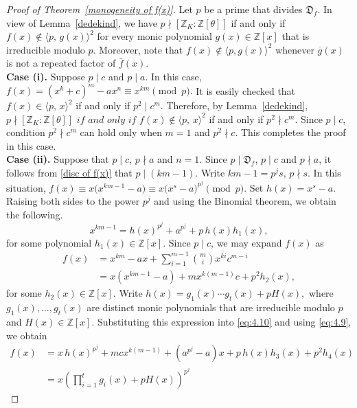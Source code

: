 \documentclass[table]{amsart}
\newcommand{\D}{\mathfrak{D}}
\numberwithin{equation}{section}
\begin{document}
\begin{proof}[Proof of Theorem~\ref{monogeneity of f(x)}]
Let $p$ be a prime that divides $\D_f$. In view of Lemma~\ref{dedekind}, we have $p \nmid [\mathbb{Z}_K : \mathbb{Z}[\theta]]$
if and only if $f(x) \not\in \langle p,\, g(x) \rangle^2$
for every monic polynomial $g(x) \in \mathbb{Z}[x]$ that is irreducible modulo $p$. Moreover, note that
$f(x) \not\in \langle p, g(x) \rangle^2$
whenever $\overline{g}(x)$ is not a repeated factor of $\bar{f}(x)$.\\[2mm]
\textbf{Case (i).} Suppose $p \mid c$ and $p \mid a$. In this case, $f(x) = (x^k + c)^m - a x^n \equiv x^{km} \pmod{p}.$ It is easily checked that $f(x) \in \langle p,\, x \rangle^2 $ if and only if $p^2 \mid c^m.$
Therefore, by Lemma~\ref{dedekind}, $p \nmid [\mathbb{Z}_K : \mathbb{Z}[\theta]]
\textit{ if and only if }
f(x) \notin \langle p,\, x \rangle^2 $ if and only if $p^2 \nmid c^m.$ Since $p \mid c$, condition $p^2 \nmid c^m$ can hold only when $m=1$ and $p^2 \nmid c$. This completes the proof in this case.\\[2mm]
\textbf{Case (ii).} Suppose that $p\mid c$, $p\nmid a$ and $n=1$.
Since $p\mid \D_f$, $p\mid c$ and $p\nmid a$, it follows from
\eqref{disc of f(x)} that $p\mid (km-1).$ Write $km-1=p^{j}s,
\, p\nmid s.$ In this situation, $f(x)\equiv x\bigl(x^{km-1}-a\bigr)
      \equiv x\bigl(x^{s}-a\bigr)^{p^{j}}
      \pmod{p}.$
Set $h(x)=x^{s}-a.$ Raising both sides to the power $p^{j}$ and using the Binomial theorem, we obtain the following.
\begin{equation}\label{eq:4.9}
x^{km-1}
= h(x)^{p^{j}} + a^{p^{j}} + p\,h(x)h_{1}(x),
\end{equation}
for some polynomial $h_{1}(x)\in\mathbb{Z}[x]$. Since $p\mid c$, we may expand $f(x)$ as
\begin{align}\label{eq:4.10}
f(x)
&= x^{km}-ax+\sum_{i=1}^{m-1}\binom{m}{i}x^{ki}c^{m-i} \nonumber \\
&= x(x^{km-1}-a)+m x^{k(m-1)}c + p^{2}h_{2}(x),
\end{align}
for some $h_{2}(x)\in\mathbb{Z}[x]$. Write $h(x)=g_{1}(x)\cdots g_{t}(x)+pH(x),$ where $g_{1}(x),\ldots,g_{t}(x)$ are distinct monic polynomials that are irreducible modulo $p$ and $H(x)\in\mathbb{Z}[x]$.
Substituting this expression into \eqref{eq:4.10} and using
\eqref{eq:4.9}, we obtain
\begin{align*}
f(x)
&= x\,h(x)^{p^{j}} + m c x^{k(m-1)} + (a^{p^{j}}-a)x
   + p\,h(x)h_{3}(x) + p^{2}h_{4}(x) \\
&= x\left(\prod_{i=1}^{t} g_i(x)+pH(x)\right)^{p^{j}}

\end{align*}
\end{proof}
\end{document}
